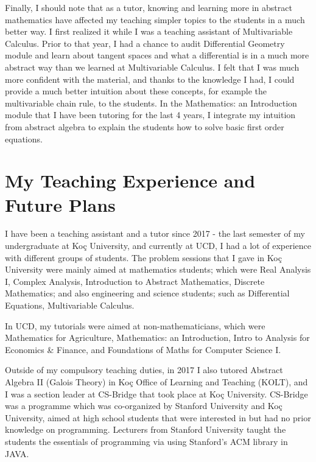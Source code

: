 \documentclass{article}
\begin{document}
\par Finally, I should note that as a tutor, knowing and learning more in abstract mathematics have affected my teaching simpler topics to the students in a much better way. I first realized it while I was a teaching assistant of Multivariable Calculus. Prior to that year, I had a chance to audit Differential Geometry module and learn about tangent spaces and what a differential is in a much more abstract way than we learned at Multivariable Calculus. I felt that I was much more confident with the material, and thanks to the knowledge I had, I could provide a much better intuition about these concepts, for example the multivariable chain rule, to the students. In the Mathematics: an Introduction module that I have been tutoring for the last 4 years, I integrate my intuition from abstract algebra to explain the students how to solve basic first order equations.

\section*{My Teaching Experience and Future Plans}

\par I have been a teaching assistant and a tutor since 2017 - the last semester of my undergraduate at Koç University, and currently at UCD, I had a lot of experience with different groups of students. The problem sessions that I gave in Koç University were mainly aimed at mathematics students; which were Real Analysis I, Complex Analysis, Introduction to Abstract Mathematics, Discrete Mathematics; and also engineering and science students; such as Differential Equations, Multivariable Calculus. 

\vspace{5mm}

\par In UCD, my tutorials were aimed at non-mathematicians, which were Mathematics for Agriculture, Mathematics: an Introduction, Intro to Analysis for Economics \& Finance, and Foundations of Maths for Computer Science I. 

\vspace{5mm}

\par Outside of my compulsory teaching duties, in 2017 I also tutored Abstract Algebra II (Galois Theory) in Koç Office of Learning and Teaching (KOLT), and I was a section leader at CS-Bridge that took place at Koç University. CS-Bridge was a programme which was co-organized by Stanford University and Koç University, aimed at high school students that were interested in but had no prior knowledge on programming. Lecturers from Stanford University taught the students the essentials of programming via using Stanford's ACM library in JAVA.
\end{document}
